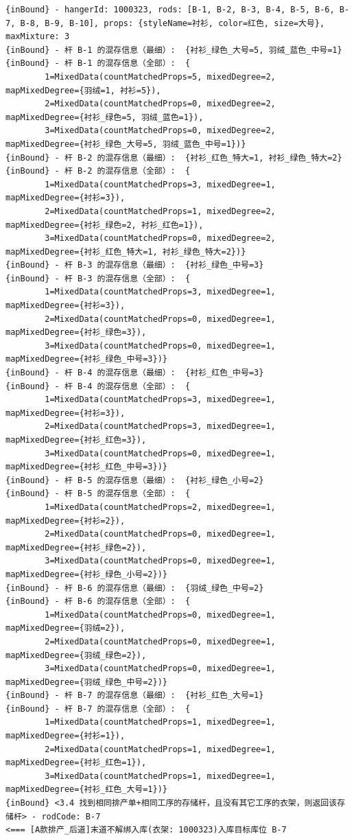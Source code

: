 {\begin{verbatim}
{inBound} - hangerId: 1000323, rods: [B-1, B-2, B-3, B-4, B-5, B-6, B-7, B-8, B-9, B-10], props: {styleName=衬衫, color=红色, size=大号}, maxMixture: 3
{inBound} - 杆 B-1 的混存信息（最细）:  {衬衫_绿色_大号=5, 羽绒_蓝色_中号=1}
{inBound} - 杆 B-1 的混存信息（全部）:  {
		1=MixedData(countMatchedProps=5, mixedDegree=2, mapMixedDegree={羽绒=1, 衬衫=5}), 
		2=MixedData(countMatchedProps=0, mixedDegree=2, mapMixedDegree={衬衫_绿色=5, 羽绒_蓝色=1}), 
		3=MixedData(countMatchedProps=0, mixedDegree=2, mapMixedDegree={衬衫_绿色_大号=5, 羽绒_蓝色_中号=1})}
{inBound} - 杆 B-2 的混存信息（最细）:  {衬衫_红色_特大=1, 衬衫_绿色_特大=2}
{inBound} - 杆 B-2 的混存信息（全部）:  {
		1=MixedData(countMatchedProps=3, mixedDegree=1, mapMixedDegree={衬衫=3}), 
		2=MixedData(countMatchedProps=1, mixedDegree=2, mapMixedDegree={衬衫_绿色=2, 衬衫_红色=1}), 
		3=MixedData(countMatchedProps=0, mixedDegree=2, mapMixedDegree={衬衫_红色_特大=1, 衬衫_绿色_特大=2})}
{inBound} - 杆 B-3 的混存信息（最细）:  {衬衫_绿色_中号=3}
{inBound} - 杆 B-3 的混存信息（全部）:  {
		1=MixedData(countMatchedProps=3, mixedDegree=1, mapMixedDegree={衬衫=3}), 
		2=MixedData(countMatchedProps=0, mixedDegree=1, mapMixedDegree={衬衫_绿色=3}), 
		3=MixedData(countMatchedProps=0, mixedDegree=1, mapMixedDegree={衬衫_绿色_中号=3})}
{inBound} - 杆 B-4 的混存信息（最细）:  {衬衫_红色_中号=3}
{inBound} - 杆 B-4 的混存信息（全部）:  {
		1=MixedData(countMatchedProps=3, mixedDegree=1, mapMixedDegree={衬衫=3}), 
		2=MixedData(countMatchedProps=3, mixedDegree=1, mapMixedDegree={衬衫_红色=3}), 
		3=MixedData(countMatchedProps=0, mixedDegree=1, mapMixedDegree={衬衫_红色_中号=3})}
{inBound} - 杆 B-5 的混存信息（最细）:  {衬衫_绿色_小号=2}
{inBound} - 杆 B-5 的混存信息（全部）:  {
		1=MixedData(countMatchedProps=2, mixedDegree=1, mapMixedDegree={衬衫=2}), 
		2=MixedData(countMatchedProps=0, mixedDegree=1, mapMixedDegree={衬衫_绿色=2}), 
		3=MixedData(countMatchedProps=0, mixedDegree=1, mapMixedDegree={衬衫_绿色_小号=2})}
{inBound} - 杆 B-6 的混存信息（最细）:  {羽绒_绿色_中号=2}
{inBound} - 杆 B-6 的混存信息（全部）:  {
		1=MixedData(countMatchedProps=0, mixedDegree=1, mapMixedDegree={羽绒=2}), 
		2=MixedData(countMatchedProps=0, mixedDegree=1, mapMixedDegree={羽绒_绿色=2}), 
		3=MixedData(countMatchedProps=0, mixedDegree=1, mapMixedDegree={羽绒_绿色_中号=2})}
{inBound} - 杆 B-7 的混存信息（最细）:  {衬衫_红色_大号=1}
{inBound} - 杆 B-7 的混存信息（全部）:  {
		1=MixedData(countMatchedProps=1, mixedDegree=1, mapMixedDegree={衬衫=1}), 
		2=MixedData(countMatchedProps=1, mixedDegree=1, mapMixedDegree={衬衫_红色=1}), 
		3=MixedData(countMatchedProps=1, mixedDegree=1, mapMixedDegree={衬衫_红色_大号=1})}
{inBound} <3.4 找到相同排产单+相同工序的存储杆，且没有其它工序的衣架，则返回该存储杆> - rodCode: B-7
<=== [A款排产_后道]末道不解绑入库(衣架: 1000323)入库目标库位 B-7


\end{verbatim}}
